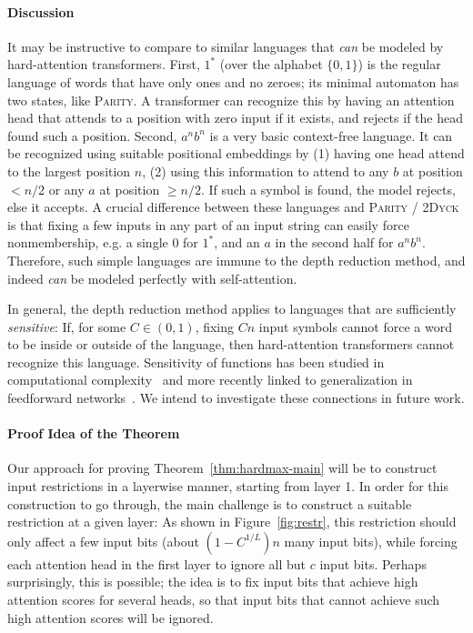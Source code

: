 \documentclass[11pt,a4paper]{article}
\begin{document}
\paragraph{Discussion}
It may be instructive to compare to similar languages that \emph{can} be modeled by hard-attention transformers.
First, $1^*$ (over the alphabet $\{0,1\}$) is the regular language of words that have only ones and no zeroes; its minimal automaton has two states, like \textsc{Parity}.
A transformer can recognize this by having an attention head that attends to a position with zero input if it exists, and rejects if the head found such a position.
Second, $a^nb^n$ is a very basic context-free language.
It can be recognized using suitable positional embeddings by (1) having one head attend to the largest position $n$, (2) using this information to attend to any $b$ at position $<n/2$ or any $a$ at position $\geq n/2$. If such a symbol is found, the model rejects, else it accepts.
A crucial difference between these languages and \textsc{Parity} / \textsc{2Dyck} is that fixing a few inputs in any part of an input string can easily force nonmembership, e.g. a single 0 for $1^*$, and an $a$ in the second half for $a^nb^n$.
Therefore, such simple languages are immune to the depth reduction method, and indeed \emph{can} be modeled perfectly with self-attention.

In general, the depth reduction method applies to languages that are sufficiently \emph{sensitive}: If, for some $C \in (0,1)$, fixing $Cn$ input symbols cannot force a word to be inside or outside of the language, then hard-attention transformers cannot recognize this language.
Sensitivity of functions 
has been studied in computational complexity~\cite{boppana1997average,gopalan2016smooth} and more recently linked to generalization in feedforward networks~\cite{de2018deep}.
We intend to investigate these connections in future work.



\paragraph{Proof Idea of the Theorem}
Our approach for proving Theorem~\ref{thm:hardmax-main} will be to construct input restrictions in a layerwise manner, starting from layer 1. 
In order for this construction to go through, the main challenge is to construct a suitable restriction at a given layer:
As shown in Figure~\ref{fig:restr}, this restriction should only affect a few input bits (about $(1-C^{1/L})n$ many input bits), while forcing each attention head in the first layer to ignore all but $c$ input bits.
Perhaps surprisingly, this is possible; the idea is to fix input bits that achieve high attention scores for several heads, so that input bits that cannot achieve such high attention scores will be ignored.
\end{document}
